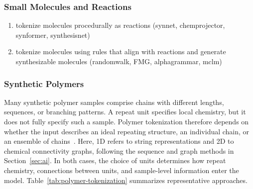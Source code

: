 \subsubsection{Small Molecules and Reactions}




\begin{enumerate}
    \item tokenize molecules procedurally as reactions (synnet, chemprojector, synformer, synthesisnet)
    \item tokenize molecules using rules that align with reactions and generate synthesizable molecules (randomwalk, FMG, alphagrammar, mclm)
\end{enumerate}

\clearpage
\subsubsection{Synthetic Polymers}
\label{sec:synthetic-polymers}

Many synthetic polymer samples comprise chains with different lengths, sequences, or branching patterns. A repeat unit specifies local chemistry, but it does not fully specify such a sample. Polymer tokenization therefore depends on whether the input describes an ideal repeating structure, an individual chain, or an ensemble of chains~\citep{lin2019bigsmiles,aldeghi2022ensemble}. Here, 1D refers to string representations and 2D to chemical connectivity graphs, following the sequence and graph methods in Section~\ref{sec:ai}. In both cases, the choice of units determines how repeat chemistry, connections between units, and sample-level information enter the model. Table~\ref{tab:polymer-tokenization} summarizes representative approaches.

